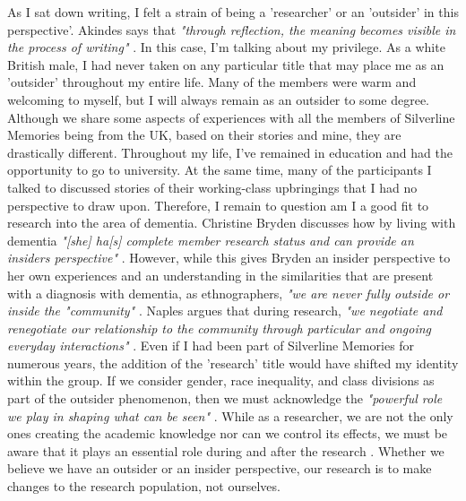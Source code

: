 As I sat down writing, I felt a strain of being a 'researcher' or an 'outsider' in this perspective'. Akindes says that \textit{"through reflection, the meaning becomes visible in the process of writing"} \citep{akindes_pahalas_2001}. In this case, I'm talking about my privilege. As a white British male, I had never taken on any particular title that may place me as an 'outsider' throughout my entire life. Many of the members were warm and welcoming to myself, but I will always remain as an outsider to some degree. Although we share some aspects of experiences with all the members of Silverline Memories being from the UK, based on their stories and mine, they are drastically different. Throughout my life, I've remained in education and had the opportunity to go to university. At the same time, many of the participants I talked to discussed stories of their working-class upbringings that I had no perspective to draw upon. Therefore, I remain to question am I a good fit to research into the area of dementia. Christine Bryden discusses how by living with dementia\textit{ "[she] ha[s] complete member research status and can provide an insiders perspective"} \citep{bryden_challenging_2020}. However, while this gives Bryden an insider perspective to her own experiences and an understanding in the similarities that are present with a diagnosis with dementia, as ethnographers, \textit{"we are never fully outside or inside the "community"} \citep{naples2003feminism}. Naples argues that during research, \textit{"we negotiate and renegotiate our relationship to the community through particular and ongoing everyday interactions"} \citep{naples2003feminism}. Even if I had been part of Silverline Memories for numerous years, the addition of the 'research' title would have shifted my identity within the group. If we consider gender, race inequality, and class divisions as part of the outsider phenomenon, then we must acknowledge the \textit{"powerful role we play in shaping what can be seen"} \citep{naples2003feminism}. While as a researcher, we are not the only ones creating the academic knowledge nor can we control its effects, we must be aware that it plays an essential role during and after the research \citep{irwin_into_2006}. Whether we believe we have an outsider or an insider perspective, our research is to make changes to the research population, not ourselves. 

